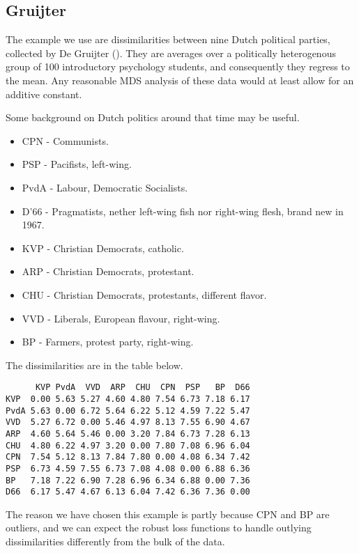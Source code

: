 \documentclass[
  12pt,
  letterpaper,
  DIV=11,
  numbers=noendperiod]{scrartcl}
\providecommand{\tightlist}{%
  \setlength{\itemsep}{0pt}\setlength{\parskip}{0pt}}\usepackage{longtable,booktabs,array}
\theoremstyle{plain}
\theoremstyle{remark}
\begin{document}
\subsection{Gruijter}\label{gruijter}

The example we use are dissimilarities between nine Dutch political
parties, collected by De Gruijter ().
They are averages over a politically heterogenous group of 100
introductory psychology students, and consequently they regress to the
mean. Any reasonable MDS analysis of these data would at least allow for
an additive constant.

Some background on Dutch politics around that time may be useful.

\begin{itemize}
\tightlist
\item
  CPN - Communists.
\item
  PSP - Pacifists, left-wing.
\item
  PvdA - Labour, Democratic Socialists.
\item
  D'66 - Pragmatists, nether left-wing fish nor right-wing flesh, brand
  new in 1967.
\item
  KVP - Christian Democrats, catholic.
\item
  ARP - Christian Democrats, protestant.
\item
  CHU - Christian Democrats, protestants, different flavor.
\item
  VVD - Liberals, European flavour, right-wing.
\item
  BP - Farmers, protest party, right-wing.
\end{itemize}

The dissimilarities are in the table below.

\begin{verbatim}
      KVP PvdA  VVD  ARP  CHU  CPN  PSP   BP  D66
KVP  0.00 5.63 5.27 4.60 4.80 7.54 6.73 7.18 6.17
PvdA 5.63 0.00 6.72 5.64 6.22 5.12 4.59 7.22 5.47
VVD  5.27 6.72 0.00 5.46 4.97 8.13 7.55 6.90 4.67
ARP  4.60 5.64 5.46 0.00 3.20 7.84 6.73 7.28 6.13
CHU  4.80 6.22 4.97 3.20 0.00 7.80 7.08 6.96 6.04
CPN  7.54 5.12 8.13 7.84 7.80 0.00 4.08 6.34 7.42
PSP  6.73 4.59 7.55 6.73 7.08 4.08 0.00 6.88 6.36
BP   7.18 7.22 6.90 7.28 6.96 6.34 6.88 0.00 7.36
D66  6.17 5.47 4.67 6.13 6.04 7.42 6.36 7.36 0.00
\end{verbatim}

The reason we have chosen this example is partly because CPN and BP are
outliers, and we can expect the robust loss functions to handle outlying
dissimilarities differently from the bulk of the data.
\end{document}
